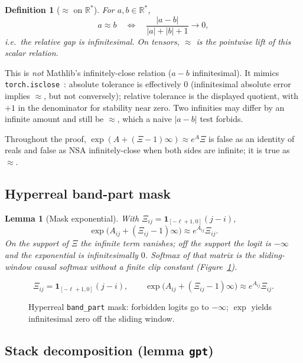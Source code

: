 \documentclass[11pt,a4paper]{article}
\newtheorem{lemma}[theorem]{Lemma}
\newtheorem{definition}[theorem]{Definition}
\newcommand{\XEq}{\approx}
\newcommand{\Rstar}{\mathbb{R}^*}
\begin{document}
\begin{definition}[\texorpdfstring{$\XEq$}{approx} on \texorpdfstring{$\Rstar$}{R*}]
\label{def:xeq}
For $a,b\in\Rstar$,
\[
a\XEq b
\quad\Longleftrightarrow\quad
\frac{|a-b|}{|a|+|b|+1}\to 0,
\]
i.e.\ the relative gap is infinitesimal.
On tensors, $\XEq$ is the pointwise lift of this scalar relation.
\end{definition}

This is \emph{not} Mathlib's infinitely-close relation ($a-b$ infinitesimal).
It mimics \texttt{torch.isclose}~\cite{pytorch_isclose}:
absolute tolerance is effectively $0$ (infinitesimal absolute error implies $\XEq$, but not conversely);
relative tolerance is the displayed quotient, with $+1$ in the denominator for stability near zero.
Two infinities may differ by an infinite amount and still be $\XEq$, which a naive $|a-b|$ test forbids.

Throughout the proof, $\exp(A+(\Xi-1)\infty)\XEq e^{A}\Xi$ is false as an identity of reals and false as NSA infinitely-close when both sides are infinite; it is true as $\XEq$.

\subsection{Hyperreal band-part mask}

\begin{lemma}[Mask exponential]
\label{lem:mask}
With $\Xi_{ij}=\mathbf{1}_{[-\ell+1,0]}(j-i)$,
\[
\exp\bigl(A_{ij}+(\Xi_{ij}-1)\infty\bigr)\XEq e^{A_{ij}}\Xi_{ij}.
\]
On the support of $\Xi$ the infinite term vanishes; off the support the logit is $-\infty$ and the exponential is infinitesimally $0$.
Softmax of that matrix is the sliding-window causal softmax without a finite clip constant (Figure~\ref{fig:mask}).
\end{lemma}

\begin{figure}[ht]
\centering
\[
\Xi_{ij}=\mathbf{1}_{[-\ell+1,0]}(j-i),\qquad
\exp\bigl(A_{ij}+(\Xi_{ij}-1)\infty\bigr)\XEq e^{A_{ij}}\Xi_{ij}.
\]
\caption{Hyperreal \texttt{band\_part} mask: forbidden logits go to $-\infty$; $\exp$ yields infinitesimal zero off the sliding window.}
\label{fig:mask}
\end{figure}

\subsection{Stack decomposition (lemma \texttt{gpt})}
\end{document}
